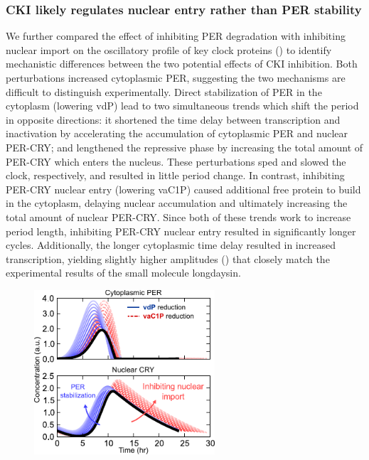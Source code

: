 \subsubsection{CKI likely regulates nuclear entry rather than PER stability}
We further compared the effect of inhibiting PER degradation with inhibiting nuclear import on the oscillatory profile of key clock proteins () to identify mechanistic differences between the two potential effects of CKI inhibition. 
Both perturbations increased cytoplasmic PER, suggesting the two mechanisms are difficult to distinguish experimentally. 
Direct stabilization of PER in the cytoplasm (lowering vdP) lead to two simultaneous trends which shift the period in opposite directions: it shortened the time delay between transcription and inactivation by accelerating the accumulation of cytoplasmic PER and nuclear PER-CRY; and lengthened the repressive phase by increasing the total amount of PER-CRY which enters the nucleus. 
These perturbations sped and slowed the clock, respectively, and resulted in little period change. 
In contrast, inhibiting PER-CRY nuclear entry (lowering vaC1P) caused additional free protein to build in the cytoplasm, delaying nuclear accumulation and ultimately increasing the total amount of nuclear PER-CRY. 
Since both of these trends work to increase period length, inhibiting PER-CRY nuclear entry resulted in significantly longer cycles. 
Additionally, the longer cytoplasmic time delay resulted in increased transcription, yielding slightly higher amplitudes () that closely match the experimental results of the small molecule longdaysin.

\begin{figure}[h]
  \centering
  \includegraphics[width=0.6\textwidth]{chap4/figures/fig4c.pdf}
  \label{fig:44c}
\end{figure}


